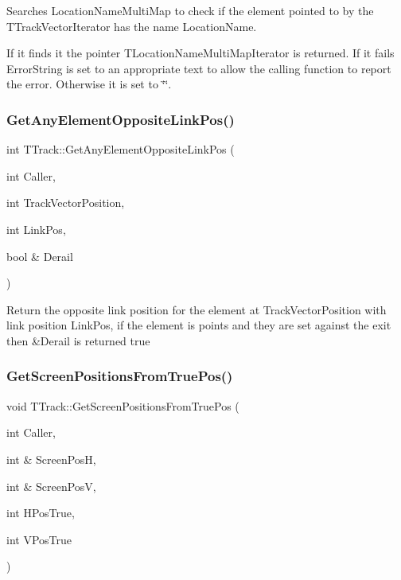 Searches Location\+Name\+Multi\+Map to check if the element pointed to by the T\+Track\+Vector\+Iterator has the name Location\+Name.

If it finds it the pointer T\+Location\+Name\+Multi\+Map\+Iterator is returned. If it fails Error\+String is set to an appropriate text to allow the calling function to report the error. Otherwise it is set to \char`\"{}\char`\"{}. \mbox{\label{class_t_track_a5b63dde2b21a37d5db7e4d078b03a74c}} 
\subsubsection{\texorpdfstring{Get\+Any\+Element\+Opposite\+Link\+Pos()}{GetAnyElementOppositeLinkPos()}}
{\footnotesize\ttfamily int T\+Track\+::\+Get\+Any\+Element\+Opposite\+Link\+Pos (\begin{DoxyParamCaption}\item[{int}]{Caller,  }\item[{int}]{Track\+Vector\+Position,  }\item[{int}]{Link\+Pos,  }\item[{bool \&}]{Derail }\end{DoxyParamCaption})}

Return the opposite link position for the element at Track\+Vector\+Position with link position Link\+Pos, if the element is points and they are set against the exit then \&Derail is returned true \mbox{\label{class_t_track_abda5d1209d5a197f1cefb851f567736d}} 
\subsubsection{\texorpdfstring{Get\+Screen\+Positions\+From\+True\+Pos()}{GetScreenPositionsFromTruePos()}}
{\footnotesize\ttfamily void T\+Track\+::\+Get\+Screen\+Positions\+From\+True\+Pos (\begin{DoxyParamCaption}\item[{int}]{Caller,  }\item[{int \&}]{Screen\+PosH,  }\item[{int \&}]{Screen\+PosV,  }\item[{int}]{H\+Pos\+True,  }\item[{int}]{V\+Pos\+True }\end{DoxyParamCaption})}

